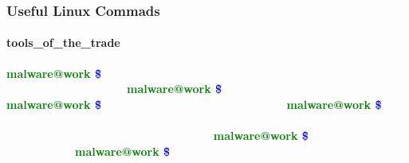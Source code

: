 \documentclass[aspectratio=169]{beamer}
\begin{document}
\begin{frame}
  \frametitle{Useful Linux Commads}
  \framesubtitle{tools\_of\_the\_trade}
  \begin{center}
    \begin{tcolorbox}[title=terminal,colback=black]
      \begin{minipage}{0.8\textwidth}
        \textbf{\textcolor{green}{malware@work \textcolor{blue}{\~ \$}}}
        \textcolor{white}{ file sample.bin}
        \newline
        \textcolor{white}{ sample.bin: PE32 executable (GUI) Intel 80386, for MS Windows}
        \newline
        \textbf{\textcolor{green}{malware@work \textcolor{blue}{\~ \$}}}
        \textcolor{white}{ exiftool sample.bin $>$ metadata.log}
        \newline
        \textbf{\textcolor{green}{malware@work \textcolor{blue}{\~ \$}}} \textcolor{white}{ hexdump -C -n 128 sample.bin $|$ less}
        \newline
        \textbf{\textcolor{green}{malware@work \textcolor{blue}{\~ \$}}}
        \textcolor{white}{ VBoxManage list vms}
        \newline
        \textcolor{white}{"win10" \{53014b4f-4c94-49b0-9036-818b84a192c9\}\newline"win7" \{942cde2e-6a84-4edc-b98a-d7326b4662ee\}}
        \newline
        \textbf{\textcolor{green}{malware@work \textcolor{blue}{\~ \$}}}
        \textcolor{white}{ VBoxManage startvm win7}
        \newline
        \textbf{\textcolor{green}{malware@work \textcolor{blue}{\~ \$}}}
      \end{minipage}
    \end{tcolorbox}
  \end{center}
\end{frame}
\end{document}
